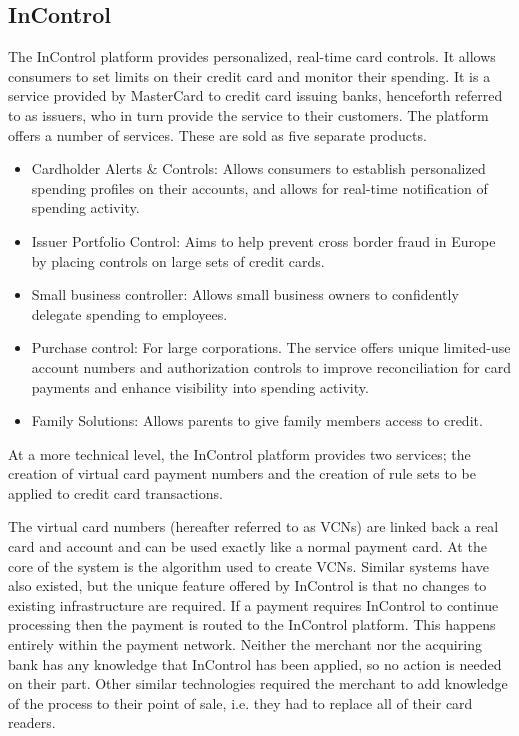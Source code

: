\documentclass[a4paper, 11pt, titlepage]{article}
\begin{document}
\subsection{InControl} 
The InControl platform provides personalized, real-time card controls. It allows consumers to set limits on their credit card and monitor their spending. It is a service provided by MasterCard to credit card issuing banks, henceforth referred to as issuers, who in turn provide the service to their customers. The platform offers a number of services. These are sold as five separate products. 
\begin{itemize} 
\item Cardholder Alerts \& Controls: Allows consumers to establish personalized spending profiles on their accounts, and allows for real-time notification of spending activity. 
\item Issuer Portfolio Control: Aims to help prevent cross border fraud in Europe by placing controls on large sets of credit cards. 
\item Small business controller: Allows small business owners to confidently delegate spending to employees. 
\item Purchase control: For large corporations. The service offers unique limited-use account numbers and authorization controls to improve reconciliation for card payments and enhance visibility into spending activity. 
\item Family Solutions: Allows parents to give family members access to credit. 
\end{itemize} 
 
At a more technical level, the InControl platform provides two services; the creation of virtual card payment numbers and the creation of rule sets to be applied to credit card transactions. 
 
The virtual card numbers (hereafter referred to as VCNs) are linked back a real card and account and can be used exactly like a normal payment card. At the core of the system is the algorithm used to create VCNs. Similar systems have also existed, but the unique feature offered by InControl is that no changes to existing infrastructure are required. If a payment requires InControl to continue processing then the payment is routed to the InControl platform. This happens entirely within the payment network. Neither the merchant nor the acquiring bank has any knowledge that InControl has been applied, so no action is needed on their part. Other similar technologies required the merchant to add knowledge of the process to their point of sale, i.e. they had to replace all of their card readers. 
 
\end{document}
